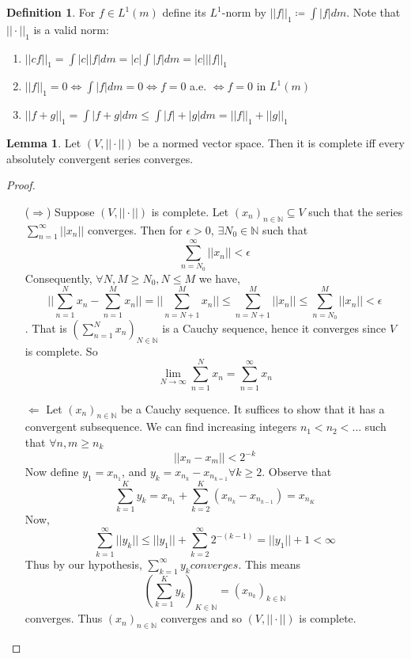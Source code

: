 \documentclass{article}
\theoremstyle{definition}
\newtheorem{definition}{Definition}[section]
\newtheorem{lemma}{Lemma}[section]
\theoremstyle{remark}
\theoremstyle{remark}
\def\naturals{{\mathbb N}}
\begin{document}
\begin{definition}
For $f \in L^1(m)$ define its $L^1$-norm by $||f||_1 \coloneqq \int |f| dm$. Note that $|| \cdot ||_1$ is a valid norm:
\begin{enumerate}
	\item $||cf||_1 = \int |c||f|dm = |c|\int|f|dm = |c|||f||_1$
	\item $||f||_1 = 0 \Leftrightarrow \int |f|dm = 0 \Leftrightarrow f= 0$ a.e. $\Leftrightarrow f = 0$ in $L^1(m)$
	\item $||f + g||_1 = \int|f+g|dm \leq \int |f| + |g| dm = ||f||_1 + ||g||_1$
\end{enumerate}
\end{definition}
\begin{lemma}
Let $(V, ||\cdot||)$ be a normed vector space. Then it is complete iff every absolutely convergent series converges.
\end{lemma}
\begin{proof}
\begin{enumerate}
	\item[($\Rightarrow$)] Suppose $(V, ||\cdot||)$ is complete. Let $(x_n)_{n\in\naturals}\subseteq V$ such that the series $\sum_{n=1}^\infty ||x_n||$ converges. Then for $\epsilon > 0$, $\exists N_0 \in\naturals$ such that
	$$\sum_{n=N_0}^\infty ||x_n|| < \epsilon$$
	Consequently, $\forall N, M \geq N_0, N\leq M$ we have,
	$$||\sum_{n=1}^N x_n - \sum_{n=1}^M x_n || = ||\sum_{n=N+1}^M x_n|| \leq \sum_{n=N+1}^M ||x_n|| \leq \sum_{n=N_0}^M ||x_n|| < \epsilon$$. That is $(\sum_{n=1}^N x_n)_{N\in\naturals}$ is a Cauchy sequence, hence it converges since $V$ is complete. So
	$$\lim_{N\to\infty} \sum_{n=1}^N x_n = \sum_{n=1}^\infty x_n$$
	\item[$\Leftarrow$] Let $(x_n)_{n\in\naturals}$ be a Cauchy sequence. It suffices to show that it has a convergent subsequence. We can find increasing integers $n_1 < n_2 < \dots$ such that $\forall n, m \geq n_k$
	$$||x_n - x_m || < 2^{-k}$$ 
	Now define $y_1 = x_{n_1}$, and $y_k = x_{n_k} - x_{n_{k=1}} \forall k \geq 2$. Observe that
	$$\sum_{k=1}^K y_k = x_{n_1} + \sum_{k=2}^K (x_{n_k} - x_{n_{k-1}}) = x_{n_K}$$
	Now,
	$$\sum_{k=1}^\infty ||y_k|| \leq ||y_1|| + \sum_{k=2}^\infty 2^{-(k - 1)} = ||y_1|| + 1 < \infty$$
	Thus by our hypothesis, $\sum_{k=1}^\infty y_k converges$. This means $$(\sum_{k=1}^K y_k)_{K\in\naturals} = (x_{n_k})_{k\in\naturals}$$ converges. 
	Thus $(x_n)_{n\in\naturals}$ converges and so $(V, ||\cdot||)$ is complete. 
\end{enumerate}
\end{proof}
\end{document}
